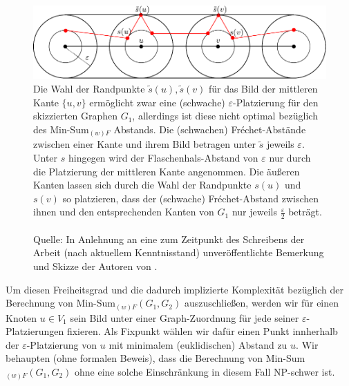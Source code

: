 \documentclass[a4paper, 12pt, twoside]{article}
\theoremstyle{Format1} %
\begin{document}
\begin{figure}[H]
    \centering
    \includegraphics[width=\textwidth]{chapter_3_example_0.pdf}
	\caption{Die Wahl der Randpunkte $\tilde{s}(u), \tilde{s}(v)$ für das Bild der mittleren Kante $\{u,v\}$ ermöglicht zwar eine
	(schwache) $\varepsilon$-Platzierung
	für den skizzierten Graphen $G_1$, allerdings ist diese nicht optimal bezüglich des Min-Sum$_{(w)F}$ Abstands.
	Die (schwachen) Fréchet-Abstände zwischen einer Kante und ihrem Bild betragen unter $\tilde{s}$ jeweils $\varepsilon$.
	Unter $s$ hingegen wird der Flaschenhals-Abstand von $\varepsilon$ nur durch die Platzierung der mittleren Kante angenommen.
	Die äußeren Kanten lassen sich durch die Wahl der Randpunkte $s(u)$ und $s(v)$ so platzieren, dass der (schwache) Fréchet-Abstand zwischen ihnen und
	den entsprechenden Kanten von $G_1$ nur jeweils $\frac{\varepsilon}{2}$ beträgt.
	\\
	\\
	Quelle: In Anlehnung an eine zum Zeitpunkt des Schreibens der Arbeit (nach aktuellem Kenntnisstand) unveröffentlichte Bemerkung und Skizze der Autoren von \cite{Buchin}.
	}
    \label{chapter_3_example_0}
\end{figure}

Um diesen Freiheitsgrad und die dadurch implizierte Komplexität bezüglich der Berechnung von Min-Sum$_{(w)F}(G_1,G_2)$ auszuschließen,
werden wir für einen Knoten $u \in V_1$ sein Bild unter einer Graph-Zuordnung für jede seiner $\varepsilon$-Platzierungen fixieren.
Als Fixpunkt wählen wir dafür einen Punkt innherhalb der $\varepsilon$-Platzierung von $u$ mit minimalem (euklidischen) Abstand zu $u$.
Wir behaupten (ohne formalen Beweis), dass die Berechnung von Min-Sum$_{(w)F}(G_1,G_2)$ ohne eine solche Einschränkung in diesem Fall NP-schwer ist.
\end{document}
